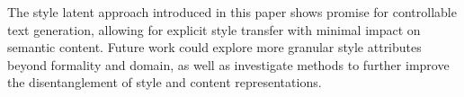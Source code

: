 \documentclass[twocolumn]{article}
\begin{document}
The style latent approach introduced in this paper shows promise for controllable text generation, allowing for explicit style transfer with minimal impact on semantic content. Future work could explore more granular style attributes beyond formality and domain, as well as investigate methods to further improve the disentanglement of style and content representations.


\small

\end{document}
